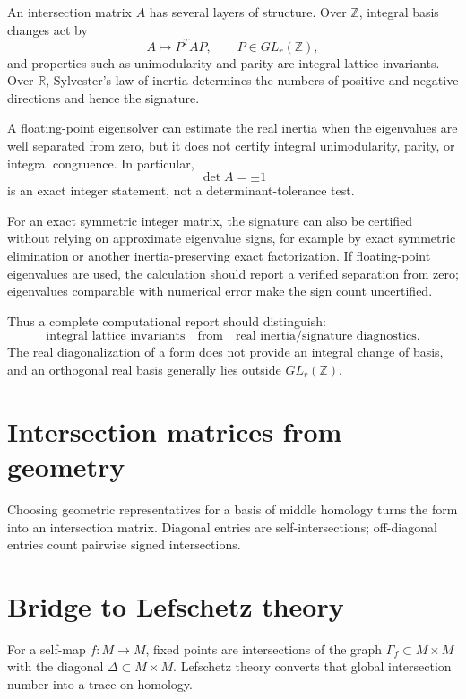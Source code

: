 \begin{remark}
An intersection matrix \(A\) has several layers of structure.  Over
\(\mathbb Z\), integral basis changes act by
\[
A\longmapsto P^TAP,
\qquad P\in GL_r(\mathbb Z),
\]
and properties such as unimodularity and parity are integral lattice
invariants.  Over \(\mathbb R\), Sylvester's law of inertia determines the
numbers of positive and negative directions and hence the signature.

A floating-point eigensolver can estimate the real inertia when the eigenvalues
are well separated from zero, but it does not certify integral unimodularity,
parity, or integral congruence.  In particular,
\[
\det A=\pm1
\]
is an exact integer statement, not a determinant-tolerance test.

For an exact symmetric integer matrix, the signature can also be certified
without relying on approximate eigenvalue signs, for example by exact
symmetric elimination or another inertia-preserving exact factorization.
If floating-point eigenvalues are used, the calculation should report a
verified separation from zero; eigenvalues comparable with numerical error
make the sign count uncertified.

Thus a complete computational report should distinguish:
\[
\text{integral lattice invariants}
\quad\text{from}\quad
\text{real inertia/signature diagnostics}.
\]
The real diagonalization of a form does not provide an integral change of
basis, and an orthogonal real basis generally lies outside \(GL_r(\mathbb Z)\).
\end{remark}

\section{Intersection matrices from geometry}
Choosing geometric representatives for a basis of middle homology turns the
form into an intersection matrix.  Diagonal entries are self-intersections;
off-diagonal entries count pairwise signed intersections.

\section{Bridge to Lefschetz theory}
For a self-map $f:M\to M$, fixed points are intersections of the graph
$\Gamma_f\subset M\times M$ with the diagonal $\Delta\subset M\times M$.
Lefschetz theory converts that global intersection number into a trace on
homology.

